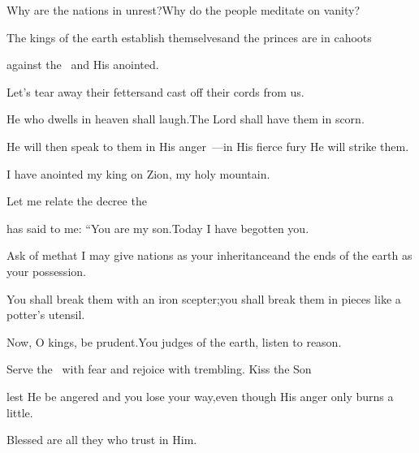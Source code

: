 
\begin{inparaenum}
  \pb {} Why are the nations in unrest?\pa Why do the people meditate on vanity?%
  
  \pb {} The kings of the earth establish themselves\pa and the princes are in cahoots%
  
  \pc against the \lord\ and His anointed.%
  
  \pb {} Let's tear away their fetters\pa and cast off their cords from us.%
  
  \pc {} He who dwells in heaven shall laugh.\pa The Lord%
  shall have them in scorn.%
  
  \pb {} He will then speak to them in His anger~---\pa in His fierce fury%
  He will strike them.%
  
  \pb {} I have anointed my king%
  \pa on Zion, my holy mountain.%
  
  \pc {} Let me relate the decree%
  the \lord%
  
  \pc has said to me: ``You are my son.\pa Today I have begotten you.%
  
  \pb {} Ask of me\pa that I may give nations as your inheritance\pa and the ends of the earth as your possession.%
  
  \pb {} You shall break them with an iron scepter;\pa you shall break them in pieces like a potter's utensil.%
  
  \pc {} Now, O kings, be prudent.\pa You judges of the earth, listen to reason.%
  
  \pc {} Serve the \lord\ with fear%
  \pa and rejoice with trembling.  Kiss the Son%
  
  \pc lest He be angered and you lose your way,\pa even though His anger only burns a little.%
  
  \pc Blessed are all they who trust in Him.%
\end{inparaenum}
